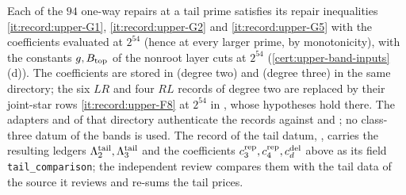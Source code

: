 \begin{certificate}\label{cert:tail-caps}
Each of the $94$ one-way repairs at a tail prime satisfies its
repair inequalities \ref{it:record:upper-G1},
\ref{it:record:upper-G2} and \ref{it:record:upper-G5} with the
coefficients evaluated at $2^{54}$ (hence at every larger prime,
by monotonicity), with the constants $g,B_{\rm top}$ of the
nonroot layer cuts at $2^{54}$
(\cref{cert:upper-band-inputs}(d)). The coefficients are stored in
(degree two) and 
(degree three) in the same directory; the six $LR$ and four $RL$ records of degree
two are replaced by their joint-star rows \ref{it:record:upper-F8} at $2^{54}$
in , whose hypotheses hold there. The
adapters 
and  of that directory authenticate
the records against  and
; no class-three datum of the bands is
used. The record of the tail datum,
, carries the
resulting ledgers $\Lambda^{\rm tail}_2,\Lambda^{\rm tail}_3$ and the
coefficients $c^{\rm rep}_3,c^{\rm rep}_4,c^{\rm del}_d$ above as its field
\texttt{tail\_comparison}; the independent review
 compares them with the
tail data of the source it reviews and re-sums the tail prices.
\end{certificate}

